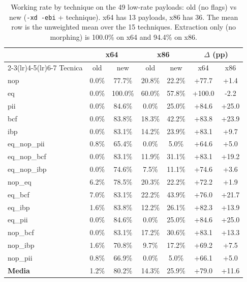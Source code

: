 \begin{table}[htbp]
\centering
\caption{Working rate by technique on the 49 low-rate payloads: old (no flags)
vs new (\texttt{-xd -ebi} + technique). x64 has 13 payloads, x86 has 36.
The mean row is the unweighted mean over the 15 techniques.
Extraction only (no morphing) is 100.0\% on x64 and 94.4\% on x86.}
\label{tab:working_rate_updated}
\begin{tabular}{lcccccc}
\toprule
 & \multicolumn{2}{c}{x64} & \multicolumn{2}{c}{x86} & \multicolumn{2}{c}{$\Delta$ (pp)} \\
\cmidrule(lr){2-3}\cmidrule(lr){4-5}\cmidrule(lr){6-7}
Tecnica & old & new & old & new & x64 & x86 \\
\midrule
nop & 0.0\% & 77.7\% & 20.8\% & 22.2\% & +77.7 & +1.4 \\
eq & 0.0\% & 100.0\% & 60.0\% & 57.8\% & +100.0 & -2.2 \\
pii & 0.0\% & 84.6\% & 0.0\% & 25.0\% & +84.6 & +25.0 \\
bcf & 0.0\% & 83.8\% & 18.3\% & 42.2\% & +83.8 & +23.9 \\
ibp & 0.0\% & 83.1\% & 14.2\% & 23.9\% & +83.1 & +9.7 \\
eq\_nop\_pii & 0.8\% & 65.4\% & 0.0\% & 5.0\% & +64.6 & +5.0 \\
eq\_nop\_bcf & 0.0\% & 83.1\% & 11.9\% & 31.1\% & +83.1 & +19.2 \\
eq\_nop\_ibp & 0.0\% & 74.6\% & 7.5\% & 11.1\% & +74.6 & +3.6 \\
nop\_eq & 6.2\% & 78.5\% & 20.3\% & 22.2\% & +72.2 & +1.9 \\
eq\_bcf & 7.0\% & 83.1\% & 22.2\% & 43.9\% & +76.0 & +21.7 \\
eq\_ibp & 1.6\% & 83.8\% & 12.2\% & 26.1\% & +82.3 & +13.9 \\
eq\_pii & 0.0\% & 84.6\% & 0.0\% & 25.0\% & +84.6 & +25.0 \\
nop\_bcf & 0.0\% & 83.1\% & 17.2\% & 30.6\% & +83.1 & +13.3 \\
nop\_ibp & 1.6\% & 70.8\% & 9.7\% & 17.2\% & +69.2 & +7.5 \\
nop\_pii & 0.8\% & 66.9\% & 0.0\% & 5.0\% & +66.1 & +5.0 \\
\midrule
\textbf{Media} & 1.2\% & 80.2\% & 14.3\% & 25.9\% & +79.0 & +11.6 \\
\bottomrule
\end{tabular}
\end{table}
